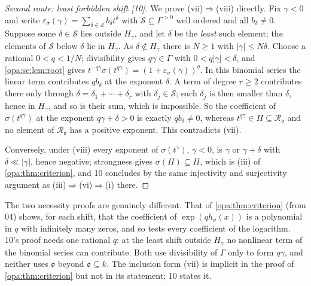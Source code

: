 \documentclass[11pt,oneside]{article}
\numberwithin{equation}{section}
\theoremstyle{definition}
\theoremstyle{remark}
\newcommand{\oo}{\mathfrak o}
\newcommand{\Ro}{\mathcal R_{\oo}}
\newcommand{\bb}{\mathbin{\ll}}
\newcommand{\src}[1]{\textup{\textsf{\small[#1]}}}
\begin{document}
\begin{proof}[Second route: least forbidden shift \src{10}]
We prove (vii)$\Rightarrow$(viii) directly. Fix $\gamma<0$ and write
$\varepsilon_\sigma(\gamma)=\sum_{\delta\in\mathcal S}b_\delta t^\delta$ with
$\mathcal S\subseteq\Gamma^{>0}$ well ordered and all $b_\delta\ne0$. Suppose some
$\delta\in\mathcal S$ lies outside $H_\gamma$, and let $\delta$ be the \emph{least} such
element; the elements of $\mathcal S$ below $\delta$ lie in $H_\gamma$. As
$\delta\notin H_\gamma$ there is $N\ge1$ with $|\gamma|\le N\delta$. Choose a
rational $0<q<1/N$; divisibility gives $q\gamma\in\Gamma$ with
$0<q|\gamma|<\delta$, and \cref{opa:sc:lem:root} gives
$t^{-q\gamma}\sigma(t^{q\gamma})=(1+\varepsilon_\sigma(\gamma))^q$. In this
binomial series the linear term contributes $qb_\delta$ at the exponent
$\delta$. A term of degree $r\ge2$ contributes there only through
$\delta=\delta_1+\cdots+\delta_r$ with $\delta_j\in\mathcal S$; each $\delta_j$ is then
smaller than $\delta$, hence in $H_\gamma$, and so is their sum, which is
impossible. So the coefficient of $\sigma(t^{q\gamma})$ at the exponent
$q\gamma+\delta>0$ is exactly $qb_\delta\ne0$, whereas $t^{q\gamma}\in\Pi\subseteq\Ro$
and no element of $\Ro$ has a positive exponent. This contradicts (vii).

Conversely, under (viii) every exponent of $\sigma(t^\gamma)$, $\gamma<0$, is
$\gamma$ or $\gamma+\delta$ with $\delta\bb|\gamma|$, hence negative; strongness gives
$\sigma(\Pi)\subseteq\Pi$, which is (iii) of \cref{opa:thm:criterion}, and 10
concludes by the same injectivity and surjectivity argument as
(iii)$\Rightarrow$(vi)$\Rightarrow$(i) there.
\end{proof}

The two necessity proofs are genuinely different. That of
\cref{opa:thm:criterion} (from 04) shows, for each shift, that the
coefficient of $\exp(qh_\sigma(x))$ is a polynomial in $q$ with infinitely many
zeros, and so tests every coefficient of the logarithm. 10's proof needs one
rational $q$: at the least shift outside $H_\gamma$ no nonlinear term of the
binomial series can contribute. Both use divisibility of $\Gamma$ only to form
$q\gamma$, and neither uses $\oo$ beyond $\oo\subseteq k$. The inclusion form (vii)
is implicit in the proof of \cref{opa:thm:criterion} but not in its
statement; 10 states it.
\end{document}
